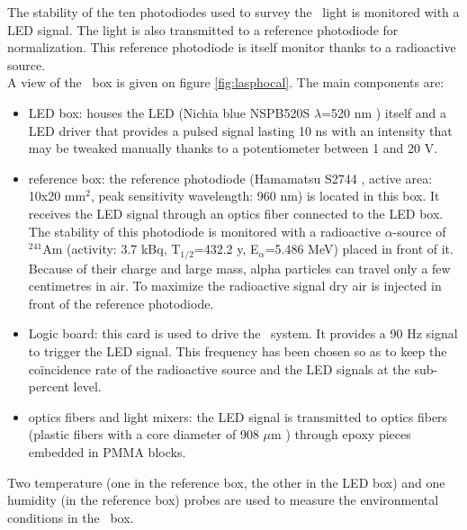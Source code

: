 The stability of the ten photodiodes used to survey the \laser~light is monitored with a LED signal. The light is also transmitted to a reference photodiode for normalization. This reference photodiode is itself monitor thanks to a radioactive source.\\
A view of the \phocal~box is given on figure \ref{fig:lasphocal}. The main components are:
\begin{itemize}
\item LED box: houses the LED (Nichia blue NSPB520S $\lambda$=520 nm \cite{ref:led}) itself and a LED driver that provides a pulsed signal lasting 10 ns with an intensity that may be tweaked manually thanks to a potentiometer between 1 and 20 V.
\item reference box: the reference photodiode (Hamamatsu S2744 \cite{ref:bigphoto}, active area: 10x20 mm$^2$, peak sensitivity wavelength: 960 nm) is located in this box. It receives the LED signal through an optics fiber connected to the LED box. The stability of this photodiode is monitored with a radioactive $\alpha$-source of $^{241}$Am (activity: 3.7 kBq, T$_{1/2}$=432.2 y, E$_{\alpha}$=5.486 MeV) placed in front of it. Because of their charge and large mass, alpha particles can travel only a few centimetres in air. To maximize the radioactive signal dry air is injected in front of the reference photodiode.
\item Logic board: this card is used to drive the \phocal~system. It provides a 90 Hz signal to trigger the LED signal. This frequency has been chosen so as to keep the coïncidence rate of the radioactive source and the LED signals at the sub-percent level.
\item optics fibers and light mixers: the LED signal is transmitted to optics fibers (plastic fibers with a core diameter of 908 $\mu$m \cite{ref:fibers}) through epoxy pieces embedded in PMMA blocks.
\end{itemize}
Two temperature (one in the reference box, the other in the LED box) and one humidity (in the reference box) probes are used to measure the environmental conditions in the \phocal~box. 

